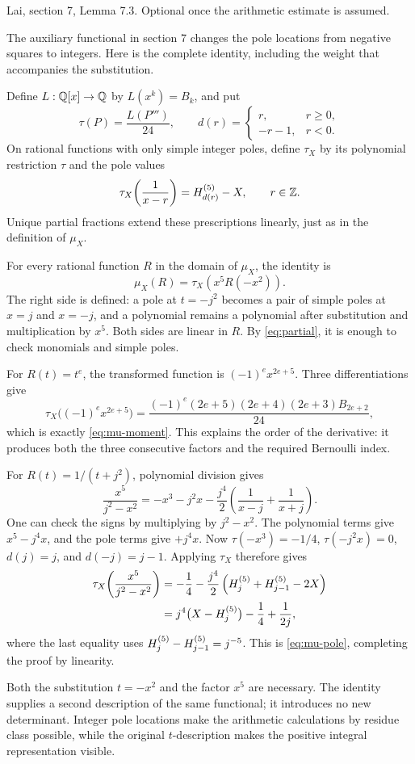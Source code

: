 \newpage
{}
{Lai, section 7, Lemma 7.3. Optional once the arithmetic estimate is assumed.}

The auxiliary functional in section 7 changes the pole locations from
negative squares to integers. Here is the complete identity, including
the weight that accompanies the substitution.

Define $L:\mathbb Q[x]\to\mathbb Q$ by $L(x^k)=B_k$, and put
\[
 \tau(P)=\frac{L(P''')}{24},\qquad
 d(r)=\begin{cases}r,&r\geq0,\\-r-1,&r<0.\end{cases}
\]
On rational functions with only simple integer poles, define $\tau_X$
by its polynomial restriction $\tau$ and the pole values
\[
 \tau_X\!\left(\frac1{x-r}\right)=H_{d(r)}^{(5)}-X,
 \qquad r\in\mathbb Z.
\]
Unique partial fractions extend these prescriptions linearly, just as
in the definition of $\mu_X$.

For every rational function $R$ in the domain of $\mu_X$, the identity is
\[
 \boxed{\mu_X(R)=\tau_X\!\left(x^5R(-x^2)\right).}
\]
The right side is defined: a pole at $t=-j^2$ becomes a pair of simple
poles at $x=j$ and $x=-j$, and a polynomial remains a polynomial after
substitution and multiplication by $x^5$. Both sides are linear in $R$.
By \eqref{eq:partial}, it is enough to check monomials and simple poles.

For $R(t)=t^e$, the transformed function is $(-1)^ex^{2e+5}$. Three
differentiations give
\[
 \tau_X\bigl((-1)^ex^{2e+5}\bigr)
 =\frac{(-1)^e(2e+5)(2e+4)(2e+3)B_{2e+2}}{24},
\]
which is exactly \eqref{eq:mu-moment}. This explains the order of the
derivative: it produces both the three consecutive factors and the
required Bernoulli index.

For $R(t)=1/(t+j^2)$, polynomial division gives
\[
 \frac{x^5}{j^2-x^2}
 =-x^3-j^2x-\frac{j^4}{2}
       \left(\frac1{x-j}+\frac1{x+j}\right).
\]
One can check the signs by multiplying by $j^2-x^2$. The polynomial
terms give $x^5-j^4x$, and the pole terms give $+j^4x$.
Now $\tau(-x^3)=-1/4$, $\tau(-j^2x)=0$, $d(j)=j$, and $d(-j)=j-1$.
Applying $\tau_X$ therefore gives
\begin{align*}
 \tau_X\!\left(\frac{x^5}{j^2-x^2}\right)
 &=-\frac14-\frac{j^4}{2}
       \left(H_{j}^{(5)}+H_{j-1}^{(5)}-2X\right)\\
 &=j^4\bigl(X-H_{j}^{(5)}\bigr)-\frac14+\frac1{2j},
\end{align*}
where the last equality uses
$H_{j}^{(5)}-H_{j-1}^{(5)}=j^{-5}$. This is \eqref{eq:mu-pole}, completing
the proof by linearity.

Both the substitution $t=-x^2$ and the factor $x^5$ are necessary.
The identity supplies a second description of the same functional;
it introduces no new determinant. Integer pole locations make the
arithmetic calculations by residue class possible, while the original
$t$-description makes the positive integral representation visible.
